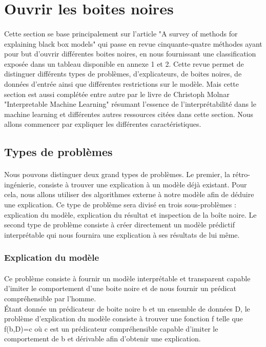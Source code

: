 \section{Ouvrir les boites noires}
\paragraph{}Cette section se base principalement sur l'article "A survey of methods for explaining black box models"\cite{surveyExplaining} qui passe en revue cinquante-quatre méthodes ayant pour but d'ouvrir différentes boites noires, en nous fournissant une classification exposée dans un tableau disponible en annexe 1 et 2. Cette revue permet de distinguer différents types de problèmes, d'explicateurs, de boites noires, de données d'entrée ainsi que différentes restrictions sur le modèle. Mais cette section est aussi complétée entre autre par le livre de Christoph Molnar "Interpretable Machine Learning" \cite{molnar2019} résumant l'essence de l'interprétabilité dans le machine learning et différentes autres ressources citées dans cette section. Nous allons commencer par expliquer les différentes caractéristiques.

\subsection{Types de problèmes}
\paragraph{}Nous pouvons distinguer deux grand types de problèmes. Le premier, la rétro-ingénierie, consiste à trouver une explication à un modèle déjà existant. Pour cela, nous allons utiliser des algorithmes externe à notre modèle afin de déduire une explication. Ce type de problème sera divisé en trois sous-problèmes : explication du modèle, explication du résultat et inspection de la boîte noire. Le second type de problème consiste à créer directement un modèle prédictif interprétable qui nous fournira une explication à ses résultats de lui même.
\subsubsection{Explication du modèle}
\paragraph{}Ce problème consiste à fournir un modèle interprétable et transparent capable d'imiter le comportement d'une boite noire et de nous fournir un prédicat compréhensible par l'homme.\\
Étant donnée un prédicateur de boite noire b et un ensemble de données D, le problème d'explication du modèle consiste à trouver une fonction f telle que f(b,D)=c où c est un prédicateur compréhensible capable d'imiter le comportement de b et dérivable afin d'obtenir une explication.


